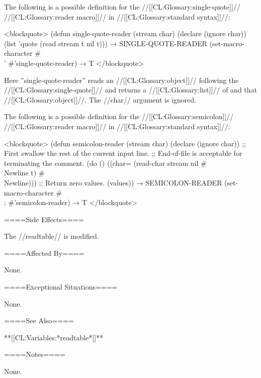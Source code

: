 The following is a possible definition for the //[[CL:Glossary:single-quote]]// //[[CL:Glossary:reader macro]]// in //[[CL:Glossary:standard syntax]]//:

<blockquote> (defun single-quote-reader (stream char) (declare (ignore char)) (list 'quote (read stream t nil t))) → SINGLE-QUOTE-READER (set-macro-character #\\' #'single-quote-reader) → T </blockquote>

Here ''single-quote-reader'' reads an //[[CL:Glossary:object]]// following the //[[CL:Glossary:single-quote]]// and returns a //[[CL:Glossary:list]]// of  and that //[[CL:Glossary:object]]//. The //char// argument is ignored.

The following is a possible definition for the //[[CL:Glossary:semicolon]]// //[[CL:Glossary:reader macro]]// in //[[CL:Glossary:standard syntax]]//:

<blockquote> (defun semicolon-reader (stream char) (declare (ignore char)) ;; First swallow the rest of the current input line. ;; End-of-file is acceptable for terminating the comment. (do () ((char= (read-char stream nil #\\Newline t) #\\Newline))) ;; Return zero values. (values)) → SEMICOLON-READER (set-macro-character #\\; #'semicolon-reader) → T </blockquote>

====Side Effects====

The //readtable// is modified.

====Affected By====

None.

====Exceptional Situations====

None.

====See Also====

**[[CL:Variables:*readtable*]]**

====Notes====

None.

